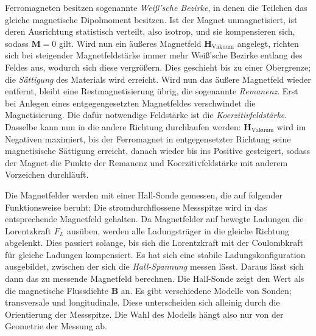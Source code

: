 Ferromagneten besitzen sogenannte \textit{Weiß'sche Bezirke}, in denen die Teilchen das gleiche magnetische Dipolmoment besitzen. 
Ist der Magnet unmagnetisiert, ist deren Ausrichtung statistisch verteilt, 
also isotrop, 
und sie kompensieren sich, sodass $\symbf{M}=0$ gilt. %
Wird nun ein äußeres Magnetfeld $\symbf{H}_\text{Vakuum}$ angelegt, richten sich bei steigender Magnetfeldstärke immer mehr Weiß'sche Bezirke entlang des 
Feldes aus, wodurch sich diese vergrößern. 
Dies geschieht bis zu einer Obergrenze; die \textit{Sättigung} des Materials wird erreicht. 
Wird nun %
das äußere Magnetfeld wieder entfernt, bleibt eine Restmagnetisierung übrig, 
die sogenannte \textit{Remanenz}. 
Erst bei Anlegen eines entgegengesetzten Magnetfeldes verschwindet die Magnetisierung. 
Die dafür notwendige Feldstärke ist die \textit{Koerzitivfeldstärke}. %
Dasselbe kann nun in die andere Richtung durchlaufen werden: $\symbf{H}_\text{Vakuum}$ wird im Negativen 
maximiert, bis der Ferromagnet in entgegensetzter Richtung seine magnetisische Sättigung erreicht, danach wieder 
bis ins Positive gesteigert, sodass der Magnet die Punkte der Remanenz und Koerzitivfeldstärke mit anderem Vorzeichen 
durchläuft. 

Die Magnetfelder werden mit einer Hall-Sonde gemessen, die auf folgender Funktionsweise beruht:
Die stromdurchflossene Messspitze wird in das entsprechende Magnetfeld gehalten.
Da Magnetfelder auf bewegte Ladungen die Lorentzkraft $F_L$ ausüben, werden %
alle Ladungsträger in die gleiche Richtung
abgelenkt. Dies passiert solange, bis sich die Lorentzkraft mit %
der Coulombkraft für gleiche Ladungen kompensiert.
Es hat sich eine stabile Ladungskonfiguration ausgebildet, zwischen der sich die \textit{Hall-Spannung} 
messen lässt. Daraus lässt sich dann das zu messende Magnetfeld berechnen. Die Hall-Sonde zeigt den %
Wert als die magnetische Flussdichte $\symbf{B}$ an. 
Es gibt verschiedene Modelle von Sonden; transversale und longitudinale. Diese unterscheiden sich alleinig durch die 
Orientierung der Messspitze. Die Wahl des Modells hängt also nur von der Geometrie der Messung ab. %

